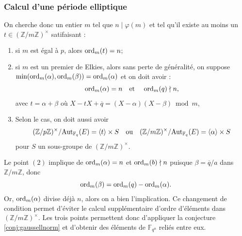 \documentclass[a4paper]{article} %
\numberwithin{section}{part}
\numberwithin{equation}{section}
\newcommand\zmodn[1]{\mathbb{Z}/#1\mathbb{Z}}
\newcommand\zmodninv[1]{(\mathbb{Z}/#1\mathbb{Z})^{\times}}
\newcommand\GF[1]{\mathbb{F}_{#1}}
\newcommand\etmath{\textup{\quad et \quad}}
\newcommand\groupgen[1]{\langle{#1}\rangle}
\newcommand\ord[2]{\textup{ord}_{#1}(#2)}
\begin{document}
\subsubsection*{Calcul d'une période elliptique}
On cherche donc un entier $m$ tel que $n\mid\varphi(m)$ et tel qu'il existe au 
moins un $t\in\zmodninv{m}$ satifaisant :

\vspace{0.3cm}
\begin{enumerate}[(1)]
    \item si $m$ est égal à $p$, alors $\ord{m}{t} = n$;

    \item si $m$ est un premier de Elkies, alors sans perte de généralité, on
    suppose $\textup{min}(\ord{m}{\alpha},\ord{m}{\beta}) = \ord{m}{\alpha}$ et
    on doit avoir :
    \begin{equation}
    \ord{m}{\alpha} = n\etmath\ord{m}{q}\nmid n, 
    \end{equation}
    avec $t = \alpha + \beta$ où $X -tX + \overline{q} = (X - \alpha)(X -
    \beta)\bmod{m}$,

    \item Selon le cas, on doit aussi avoir
    \begin{equation}
    \zmodninv{p}/\textup{Aut}_{\GF{q}}(E) = \groupgen{t}\times S 
    \quad\textup{ou}\quad
    \zmodninv{m}/\textup{Aut}_{\GF{q}}(E) = \groupgen{\alpha}\times S
    \end{equation}
    pour $S$ un sous-groupe de $\zmodninv{m}$.
    \end{enumerate}
\vspace{0.3cm}
Le point $(2)$ implique de $\ord{m}{\alpha} = n$ et $\ord{m}{b}\nmid n$ 
puisque $\beta = \overline{q}/a$ dans $\zmodn{m}$, donc 
\begin{equation}
\ord{m}{\beta} = \ord{m}{q} - \ord{m}{\alpha}.
\end{equation}
Or, $\ord{m}{\alpha}$ divise déjà $n$, alors on a bien l'implication. Ce
changement de condition permet d'éviter le calcul supplémentaire d'ordre
d'éléments dans $\zmodninv{m}$. Les trois points permettent donc d'appliquer la 
conjecture \ref{conj:gaussellnorm} et d'obtenir des éléments de $\GF{q^n}$ 
reliés entre eux.\par
\end{document}
